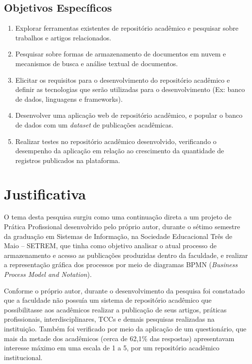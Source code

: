 \subsection{Objetivos Específicos}
\begin{enumerate}
    \item Explorar ferramentas existentes de repositório acadêmico e pesquisar sobre trabalhos e artigos relacionados.
    \item Pesquisar sobre formas de armazenamento de documentos em nuvem e mecanismos de busca e análise textual de documentos.
    \item Elicitar os requisitos para o desenvolvimento do repositório acadêmico e definir as tecnologias que serão utilizadas para o desenvolvimento (Ex: banco de dados, linguagens e frameworks).
    \item Desenvolver uma aplicação web de repositório acadêmico, e popular o banco de dados com um \emph{dataset} de publicações acadêmicas.
    \item Realizar testes no repositório acadêmico desenvolvido, verificando o desempenho da aplicação em relação ao crescimento da quantidade de registros publicados na plataforma.
\end{enumerate}

\section{Justificativa}\label{sec:justification}

O tema desta pesquisa surgiu como uma continuação direta a um projeto
de Prática Profissional desenvolvido pelo próprio autor, durante o sétimo
semestre da graduação em Sistemas de Informação, na Sociedade Educacional
Três de Maio – SETREM, que tinha como objetivo analisar o atual processo
de armazenamento e acesso as publicações produzidas dentro da faculdade,
e realizar a representação gráfica dos processos por meio de diagramas BPMN
(\emph{Business Process Model and Notation}).

Conforme o próprio autor, durante o desenvolvimento da pesquisa foi constatado que a faculdade
não possuía um sistema de repositório acadêmico que possibilitasse aos
acadêmicos realizar a publicação de seus artigos, práticas profissionais,
interdisciplinares, TCCs e demais pesquisas realizadas na instituição.
Também foi verificado por meio da aplicação de um questionário, que
mais da metade dos acadêmicos (cerca de 62,1\% das respostas) apresentavam
interesse máximo em uma escala de 1 a 5, por um repositório acadêmico
institucional.

